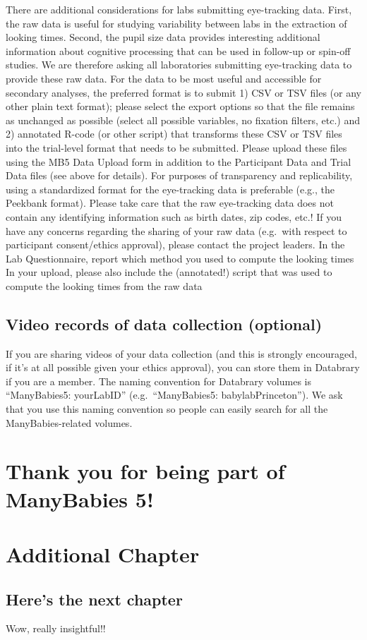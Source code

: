 \documentclass[
]{book}
\begin{document}
There are additional considerations for labs submitting eye-tracking data. First, the raw data is useful for studying variability between labs in the extraction of looking times. Second, the pupil size data provides interesting additional information about cognitive processing that can be used in follow-up or spin-off studies. We are therefore asking all laboratories submitting eye-tracking data to provide these raw data. For the data to be most useful and accessible for secondary analyses, the preferred format is to submit 1) CSV or TSV files (or any other plain text format); please select the export options so that the file remains as unchanged as possible (select all possible variables, no fixation filters, etc.) and 2) annotated R-code (or other script) that transforms these CSV or TSV files into the trial-level format that needs to be submitted.
Please upload these files using the MB5 Data Upload form in addition to the Participant Data and Trial Data files (see above for details). For purposes of transparency and replicability, using a standardized format for the eye-tracking data is preferable (e.g., the Peekbank format). Please take care that the raw eye-tracking data does not contain any identifying information such as birth dates, zip codes, etc.! If you have any concerns regarding the sharing of your raw data (e.g.~with respect to participant consent/ethics approval), please contact the project leaders.
In the Lab Questionnaire, report which method you used to compute the looking times
In your upload, please also include the (annotated!) script that was used to compute the looking times from the raw data

\hypertarget{video-records-of-data-collection-optional}{%
\section{Video records of data collection (optional)}\label{video-records-of-data-collection-optional}}

If you are sharing videos of your data collection (and this is strongly encouraged, if it's at all possible given your ethics approval), you can store them in Databrary if you are a member. The naming convention for Databrary volumes is ``ManyBabies5: yourLabID'' (e.g.~``ManyBabies5: babylabPrinceton''). We ask that you use this naming convention so people can easily search for all the ManyBabies-related volumes.

\hypertarget{thank-you-for-being-part-of-manybabies-5}{%
\chapter*{Thank you for being part of ManyBabies 5!}\label{thank-you-for-being-part-of-manybabies-5}}

\hypertarget{additional-chapter}{%
\chapter{Additional Chapter}\label{additional-chapter}}

\hypertarget{heres-the-next-chapter}{%
\section{Here's the next chapter}\label{heres-the-next-chapter}}

Wow, really insightful!!

  
\end{document}
